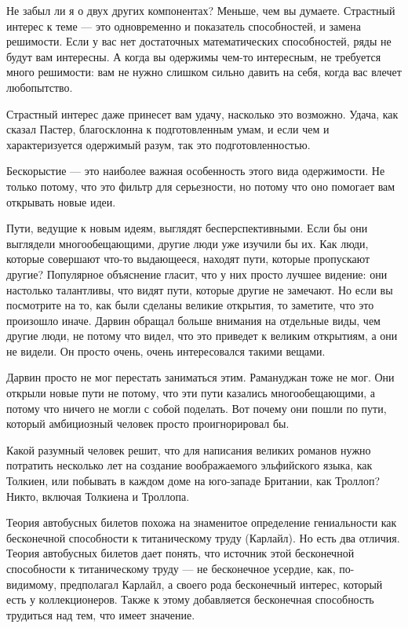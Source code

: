 \documentclass[ebook,12pt,oneside,openany]{memoir}
\begin{document}
Не забыл ли я о двух других компонентах? Меньше, чем вы думаете.
Страстный интерес к теме — это одновременно и показатель способностей,
и замена решимости. Если у вас нет достаточных математических
способностей, ряды не будут вам интересны. А когда вы одержимы чем-то
интересным, не требуется много решимости: вам не нужно слишком сильно
давить на себя, когда вас влечет любопытство. \newline

Страстный интерес даже принесет вам удачу, насколько это возможно.
Удача, как сказал Пастер, благосклонна к подготовленным умам, и если
чем и характеризуется одержимый разум, так это подготовленностью. \newline

Бескорыстие — это наиболее важная особенность этого вида одержимости.
Не только потому, что это фильтр для серьезности, но потому что оно
помогает вам открывать новые идеи. \newline

Пути, ведущие к новым идеям, выглядят бесперспективными. Если бы они
выглядели многообещающими, другие люди уже изучили бы их. Как люди,
которые совершают что-то выдающееся, находят пути, которые пропускают
другие? Популярное объяснение гласит, что у них просто лучшее видение:
они настолько талантливы, что видят пути, которые другие не замечают.
Но если вы посмотрите на то, как были сделаны великие открытия, то
заметите, что это произошло иначе. Дарвин обращал больше внимания на
отдельные виды, чем другие люди, не потому что видел, что это приведет
к великим открытиям, а они не видели. Он просто очень, очень
интересовался такими вещами. \newline

Дарвин просто не мог перестать заниматься этим. Рамануджан тоже не
мог. Они открыли новые пути не потому, что эти пути казались
многообещающими, а потому что ничего не могли с собой поделать. Вот
почему они пошли по пути, который амбициозный человек просто
проигнорировал бы. \newline

Какой разумный человек решит, что для написания великих романов нужно
потратить несколько лет на создание воображаемого эльфийского языка,
как Толкиен, или побывать в каждом доме на юго-западе Британии, как
Троллоп? Никто, включая Толкиена и Троллопа. \newline

Теория автобусных билетов похожа на знаменитое определение
гениальности как бесконечной способности к титаническому труду
(Карлайл). Но есть два отличия. Теория автобусных билетов дает понять,
что источник этой бесконечной способности к титаническому труду — не
бесконечное усердие, как, по-видимому, предполагал Карлайл, а своего
рода бесконечный интерес, который есть у коллекционеров. Также к этому
добавляется бесконечная способность трудиться над тем, что имеет
значение. \newline
\end{document}
